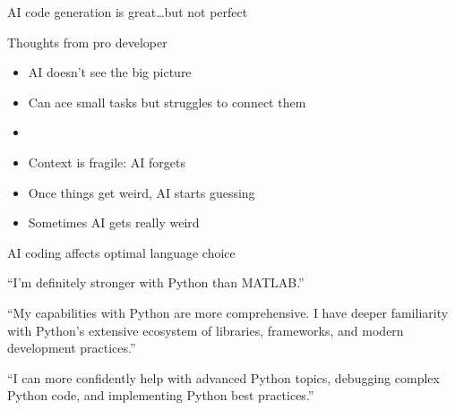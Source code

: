 \begin{frame}
    
    AI code generation is great\ldots but not perfect

\end{frame}


\begin{frame}

    Thoughts from pro developer 

    \begin{itemize}
        \item AI doesn't see the big picture
        \vspace{0.5em}
        \item Can ace small tasks but struggles to connect them 
        \vspace{0.5em}
        \item {}
        \vspace{0.5em}
        \item Context is fragile: AI forgets
        \vspace{0.5em}
        \item Once things get weird, AI starts guessing
        \vspace{0.5em}
        \item Sometimes AI gets really weird
    \end{itemize}

\end{frame}


\begin{frame}{AI coding affects optimal language choice}



    \medskip
    \medskip
    
    ``I'm definitely stronger with Python than MATLAB.''

    \vspace{0.5em}
    ``My capabilities with Python
    are more comprehensive. I have deeper familiarity with Python's extensive
    ecosystem of libraries, frameworks, and modern development practices.''


    \vspace{0.5em}
    ``I can
    more confidently help with advanced Python topics, debugging complex Python
    code, and implementing Python best practices.''

\end{frame}

